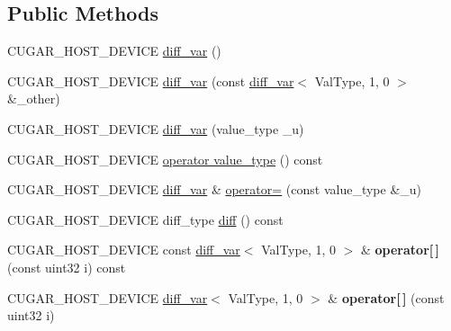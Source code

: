 \subsection*{Public Methods}
\begin{DoxyCompactItemize}
\item 
C\+U\+G\+A\+R\+\_\+\+H\+O\+S\+T\+\_\+\+D\+E\+V\+I\+CE \hyperlink{structcugar_1_1diff__var_3_01_val_type_00_011_00_010_01_4_afdbc757f2120a80a5c303ccf9321631f}{diff\+\_\+var} ()
\item 
C\+U\+G\+A\+R\+\_\+\+H\+O\+S\+T\+\_\+\+D\+E\+V\+I\+CE \hyperlink{structcugar_1_1diff__var_3_01_val_type_00_011_00_010_01_4_a4c2c9ac88b5d8c8f6f0af23315126e8b}{diff\+\_\+var} (const \hyperlink{structcugar_1_1diff__var}{diff\+\_\+var}$<$ Val\+Type, 1, 0 $>$ \&\+\_\+other)
\item 
C\+U\+G\+A\+R\+\_\+\+H\+O\+S\+T\+\_\+\+D\+E\+V\+I\+CE \hyperlink{structcugar_1_1diff__var_3_01_val_type_00_011_00_010_01_4_a634adb8e681a59a0c5c528045b19f3d8}{diff\+\_\+var} (value\+\_\+type \+\_\+u)
\item 
C\+U\+G\+A\+R\+\_\+\+H\+O\+S\+T\+\_\+\+D\+E\+V\+I\+CE \hyperlink{structcugar_1_1diff__var_3_01_val_type_00_011_00_010_01_4_a2294c47229144fc0c7d180e0fad48320}{operator value\+\_\+type} () const
\item 
C\+U\+G\+A\+R\+\_\+\+H\+O\+S\+T\+\_\+\+D\+E\+V\+I\+CE \hyperlink{structcugar_1_1diff__var}{diff\+\_\+var} \& \hyperlink{structcugar_1_1diff__var_3_01_val_type_00_011_00_010_01_4_a83d3b5f44b1feb4d68a89e8248638b4c}{operator=} (const value\+\_\+type \&\+\_\+u)
\item 
C\+U\+G\+A\+R\+\_\+\+H\+O\+S\+T\+\_\+\+D\+E\+V\+I\+CE diff\+\_\+type \hyperlink{structcugar_1_1diff__var_3_01_val_type_00_011_00_010_01_4_a6d5ba2c944731640d54ce696959b8376}{diff} () const
\item 
\mbox{\label{structcugar_1_1diff__var_3_01_val_type_00_011_00_010_01_4_adab1bcad36d8db831636eec57abe3d5c}} 
C\+U\+G\+A\+R\+\_\+\+H\+O\+S\+T\+\_\+\+D\+E\+V\+I\+CE const \hyperlink{structcugar_1_1diff__var}{diff\+\_\+var}$<$ Val\+Type, 1, 0 $>$ \& {\bfseries operator\mbox{[}$\,$\mbox{]}} (const uint32 i) const
\item 
\mbox{\label{structcugar_1_1diff__var_3_01_val_type_00_011_00_010_01_4_a6923ff68dec97950dae63eda16d82db2}} 
C\+U\+G\+A\+R\+\_\+\+H\+O\+S\+T\+\_\+\+D\+E\+V\+I\+CE \hyperlink{structcugar_1_1diff__var}{diff\+\_\+var}$<$ Val\+Type, 1, 0 $>$ \& {\bfseries operator\mbox{[}$\,$\mbox{]}} (const uint32 i)
\end{DoxyCompactItemize}
